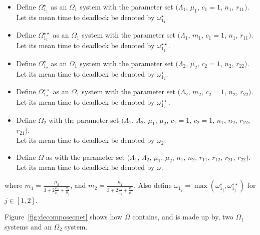 \documentclass{article}
\numberwithin{equation}{section}
\begin{document}
\begin{itemize}
  \item Define $\Omega_{1_1}^{\star}$ as an $\Omega_1$ system with the
  parameter set $(\Lambda_1$, $\mu_1$, $c_1=1$, $n_1$, $r_{11})$.\\
  Let its mean time to deadlock be denoted by $\omega_{1_1}^{\star}$.
  \item Define $\Omega_{1_1}^{\star\star}$ as an $\Omega_1$ system with the
  parameter set $(\Lambda_1$, $m_1$, $c_1=1$, $n_1$, $r_{11})$.\\
  Let its mean time to deadlock be denoted by $\omega_{1_1}^{\star\star}$.
  \item Define $\Omega_{1_2}^{\star}$ as an $\Omega_1$ system with the
  parameter set $(\Lambda_2$, $\mu_2$, $c_2=1$, $n_2$, $r_{22})$.\\
  Let its mean time to deadlock be denoted by $\omega_{1_2}^{\star}$.
  \item Define $\Omega_{1_2}^{\star\star}$ as an $\Omega_1$ system with the
  parameter set $(\Lambda_2$, $m_2$, $c_2=1$, $n_2$, $r_{22})$.\\
  Let its mean time to deadlock be denoted by $\omega_{1_2}^{\star\star}$.
  \item Define $\Omega_2$ with the parameter set $(\Lambda_1$, $\Lambda_2$,
  $\mu_1$, $\mu_2$, $c_1=1$, $c_2=1$, $n_1$, $n_2$, $r_{12}$, $r_{21})$.\\
  Let its mean time to deadlock be denoted by $\omega_2$.
  \item Define $\Omega$ as with the parameter set $(\Lambda_1$, $\Lambda_2$,
  $\mu_1$, $\mu_2$, $n_1$, $n_2$, $r_{11}$, $r_{12}$, $r_{21}$, $r_{22})$.\\
  Let its mean time to deadlock be denoted by $\omega$.
\end{itemize}

where $m_1 = \frac{\mu_2}{3 + 2\frac{\mu_2}{\mu_1} + \frac{\mu_1}{\mu_2}}$,
and $m_2 = \frac{\mu_1}{3 + 2\frac{\mu_1}{\mu_2} + \frac{\mu_2}{\mu_1}}$.
Also define $\omega_{1_j} = \max(\omega_{1_j}^{\star}, \omega_{1_j}^{\star\star})$
for $j \in [1, 2]$.

Figure~\ref{fig:decomposeqnet} shows how $\Omega$ contains, and is made up by,
two $\Omega_1$ systems and an $\Omega_2$ system.
\end{document}
